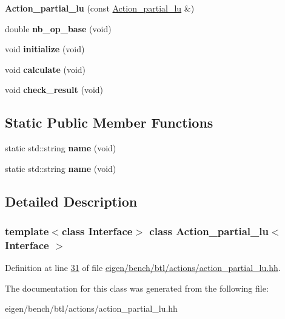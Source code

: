 \begin{DoxyCompactItemize}
{\bfseries Action\+\_\+partial\+\_\+lu} (const \hyperlink{class_action__partial__lu}{Action\+\_\+partial\+\_\+lu} \&)
\item 
\mbox{\label{class_action__partial__lu_a130df0e035223b26ded297fdcba3b9b9}} 
double {\bfseries nb\+\_\+op\+\_\+base} (void)
\item 
\mbox{\label{class_action__partial__lu_a47eac466d6b3a7b27bdd7854dc006b1a}} 
void {\bfseries initialize} (void)
\item 
\mbox{\label{class_action__partial__lu_a81d0d52e0445a2e760ee9d85d167f753}} 
void {\bfseries calculate} (void)
\item 
\mbox{\label{class_action__partial__lu_aac1f68adffffe692f6b9cf0277037396}} 
void {\bfseries check\+\_\+result} (void)
\end{DoxyCompactItemize}
\subsection*{Static Public Member Functions}
\begin{DoxyCompactItemize}
\item 
\mbox{\label{class_action__partial__lu_aded2f5d82c68536ecd12796f370ff2ec}} 
static std\+::string {\bfseries name} (void)
\item 
\mbox{\label{class_action__partial__lu_aded2f5d82c68536ecd12796f370ff2ec}} 
static std\+::string {\bfseries name} (void)
\end{DoxyCompactItemize}


\subsection{Detailed Description}
\subsubsection*{template$<$class Interface$>$\newline
class Action\+\_\+partial\+\_\+lu$<$ Interface $>$}



Definition at line \hyperlink{eigen_2bench_2btl_2actions_2action__partial__lu_8hh_source_l00031}{31} of file \hyperlink{eigen_2bench_2btl_2actions_2action__partial__lu_8hh_source}{eigen/bench/btl/actions/action\+\_\+partial\+\_\+lu.\+hh}.



The documentation for this class was generated from the following file\+:\begin{DoxyCompactItemize}
\item 
eigen/bench/btl/actions/action\+\_\+partial\+\_\+lu.\+hh\end{DoxyCompactItemize}
